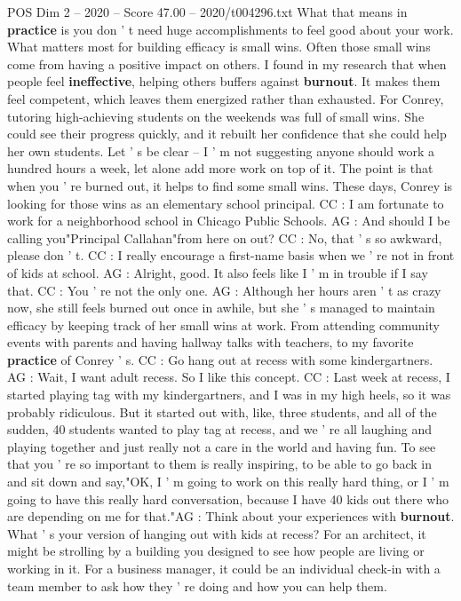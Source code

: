 \begin{textsample}{POS Dim 2 – 2020 – Score 47.00 – 2020/t004296.txt}
What that means in \textbf{practice} is you don ' t need huge accomplishments to feel good about your work.
What matters most for building efficacy is small wins.
Often those small wins come from having a positive impact on others.
I found in my research that when people feel \textbf{ineffective}, helping others buffers against \textbf{burnout}.
It makes them feel competent, which leaves them energized rather than exhausted.
For Conrey, tutoring high-achieving students on the weekends was full of small wins.
She could see their progress quickly, and it rebuilt her confidence that she could help her own students.
Let ' s be clear -- I ' m not suggesting anyone should work a hundred hours a week, let alone add more work on top of it.
The point is that when you ' re burned out, it helps to find some small wins.
These days, Conrey is looking for those wins as an elementary school principal.
CC : I am fortunate to work for a neighborhood school in Chicago Public Schools.
AG : And should I be calling you"Principal Callahan"from here on out?
CC : No, that ' s so awkward, please don ' t.
CC : I really encourage a first-name basis when we ' re not in front of kids at school.
AG : Alright, good.
It also feels like I ' m in trouble if I say that.
CC : You ' re not the only one.
AG : Although her hours aren ' t as crazy now, she still feels burned out once in awhile, but she ' s managed to maintain efficacy by keeping track of her small wins at work.
From attending community events with parents and having hallway talks with teachers, to my favorite \textbf{practice} of Conrey ' s.
CC : Go hang out at recess with some kindergartners.
AG : Wait, I want adult recess.
So I like this concept.
CC : Last week at recess, I started playing tag with my kindergartners, and I was in my high heels, so it was probably ridiculous.
But it started out with, like, three students, and all of the sudden, 40 students wanted to play tag at recess, and we ' re all laughing and playing together and just really not a care in the world and having fun.
To see that you ' re so important to them is really inspiring, to be able to go back in and sit down and say,"OK, I ' m going to work on this really hard thing, or I ' m going to have this really hard conversation, because I have 40 kids out there who are depending on me for that."AG : Think about your experiences with \textbf{burnout}.
What ' s your version of hanging out with kids at recess?
For an architect, it might be strolling by a building you designed to see how people are living or working in it.
For a business manager, it could be an individual check-in with a team member to ask how they ' re doing and how you can help them.

\end{textsample}
